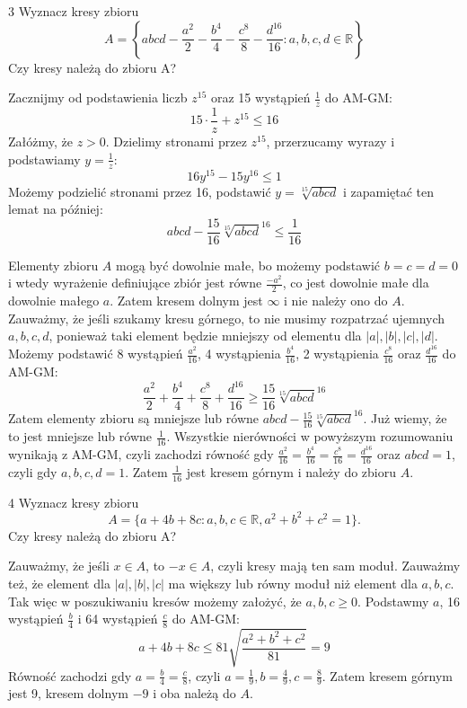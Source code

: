 \documentclass{../note}
\begin{document}
\begin{zadanie}{3}
Wyznacz kresy zbioru
\[ A = \left\{abcd - \frac{a^{2}}{2} - \frac{b^{4}}{4} - \frac{c^{8}}{8} - \frac{d^{16}}{16} : a,b,c,d \in \mathbb{R}\right\} \]
Czy kresy należą do zbioru A?
\end{zadanie}
\begin{rozwiazanie}
Zacznijmy od podstawienia liczb $z^15$ oraz 15 wystąpień $\frac1z$ do AM-GM:
\[15\cdot \frac1z + z^{15} \leqslant 16\]
Załóżmy, że $z > 0$. Dzielimy stronami przez $z^15$, przerzucamy wyrazy i podstawiamy $y = \frac1z$:
\[16y^{15} - 15y^{16} \leq 1\]
Możemy podzielić stronami przez 16, podstawić $y = \sqrt[15]{abcd}$ i zapamiętać ten lemat na później:
\begin{equation}
abcd - \frac{15}{16}\sqrt[15]{abcd}^{16} \leq \frac{1}{16}
\end{equation}

Elementy zbioru $A$ mogą być dowolnie małe, bo możemy podstawić $b = c = d = 0$ i wtedy wyrażenie definiujące zbiór jest równe $\frac{-a^2}2$, co jest dowolnie małe dla dowolnie małego $a$. Zatem kresem dolnym jest $\infty$ i nie należy ono do $A$. Zauważmy, że jeśli szukamy kresu górnego, to nie musimy rozpatrzać ujemnych $a, b, c, d$, ponieważ taki element będzie mniejszy od elementu dla $|a|, |b|, |c|, |d|$. Możemy podstawić 8 wystąpień $\frac{a^2}{16}$, 4 wystąpienia $\frac{b^4}{16}$, 2 wystąpienia $\frac{c^8}{16}$ oraz $\frac{d^16}{16}$ do AM-GM:
\[\frac{a^{2}}{2} + \frac{b^{4}}{4} + \frac{c^{8}}{8} + \frac{d^{16}}{16} \geq \frac{15}{16}\sqrt[15]{abcd}^{16}\]
Zatem elementy zbioru są mniejsze lub równe $abcd - \frac{15}{16}\sqrt[15]{abcd}^{16}$. Już wiemy, że to jest mniejsze lub równe $\frac1{16}$. Wszystkie nierówności w powyższym rozumowaniu wynikają z AM-GM, czyli zachodzi równość gdy $\frac{a^2}{16} = \frac{b^4}{16} = \frac{c^8}{16} = \frac{d^{16}}{16}$ oraz $abcd=1$, czyli gdy $a,b,c,d=1$. Zatem $\frac{1}{16}$ jest kresem górnym i należy do zbioru $A$.
\end{rozwiazanie}
\begin{zadanie}{4}
Wyznacz kresy zbioru
\[ A = \{a+4b+8c : a,b,c \in \mathbb{R}, a^{2}+b^{2}+c^{2}=1\} . \]
Czy kresy należą do zbioru A?
\end{zadanie}
\begin{rozwiazanie}
Zauważmy, że jeśli $x \in A$, to $-x \in A$, czyli kresy mają ten sam moduł. Zauważmy też, że element dla $|a|, |b|, |c|$ ma większy lub równy moduł niż element dla $a, b, c$. Tak więc w poszukiwaniu kresów możemy założyć, że $a, b, c \geq 0$. Podstawmy $a$, 16 wystąpień $\frac{b}4$ i 64 wystąpień $\frac{c}{8}$ do AM-GM:
\[a+4b+8c \leq 81\sqrt{\frac{a^2+b^2+c^2}{81}} = 9\]
Równość zachodzi gdy $a = \frac{b}4 = \frac{c}8$, czyli $a=\frac19, b=\frac49, c=\frac89$. Zatem kresem górnym jest 9, kresem dolnym $-9$ i oba należą do $A$.
\end{rozwiazanie}
\end{document}
